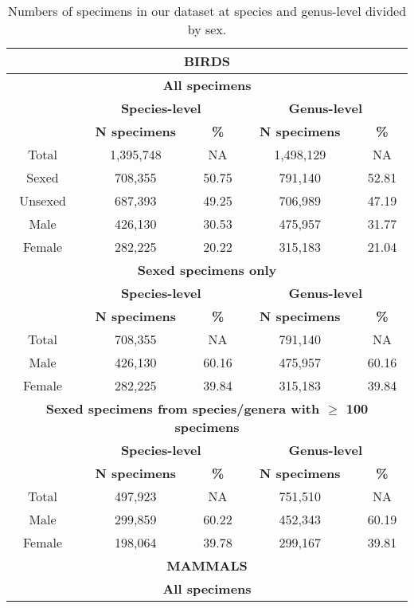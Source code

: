 
\begin{longtable}{ccccc}

\caption{Numbers of specimens in our dataset at species and genus-level divided by sex.}\\ 
  
\hline
\multicolumn{5}{c}{\textbf{BIRDS}}\\
\hline
\multicolumn{5}{c}{\textbf{All specimens}}\\
  \hline
  & \multicolumn{2}{c}{\textbf{Species-level}} & \multicolumn{2}{c}{\textbf{Genus-level}} \\
  \hline
  & \textbf{N specimens} & \textbf{\%} & \textbf{N specimens} & \textbf{\%}\\
\hline
Total & 1,395,748 & NA & 1,498,129 & NA\\
Sexed & 708,355 & 50.75 & 791,140 & 52.81\\
Unsexed & 687,393 & 49.25 & 706,989 & 47.19\\
Male & 426,130 & 30.53 & 475,957 & 31.77\\
Female & 282,225 & 20.22 & 315,183 & 21.04\\
\hline
\multicolumn{5}{c}{\textbf{Sexed specimens only}}\\
  \hline
  & \multicolumn{2}{c}{\textbf{Species-level}} & \multicolumn{2}{c}{\textbf{Genus-level}} \\
  \hline
  & \textbf{N specimens} & \textbf{\%} & \textbf{N specimens} & \textbf{\%}\\
\hline
Total & 708,355 & NA & 791,140 & NA \\
Male & 426,130 & 60.16 & 475,957 & 60.16\\
Female & 282,225 & 39.84 & 315,183 & 39.84\\
\hline
\multicolumn{5}{c}{\textbf{Sexed specimens from species/genera with $\geq$ 100 specimens}}\\
  \hline
  & \multicolumn{2}{c}{\textbf{Species-level}} & \multicolumn{2}{c}{\textbf{Genus-level}} \\
  \hline
  & \textbf{N specimens} & \textbf{\%} & \textbf{N specimens} & \textbf{\%}\\
\hline
Total & 497,923 & NA & 751,510 & NA\\
Male & 299,859 & 60.22 & 452,343 & 60.19\\
Female & 198,064 & 39.78 & 299,167 & 39.81\\
\hline
\multicolumn{5}{c}{\textbf{MAMMALS}}\\
\hline
\multicolumn{5}{c}{\textbf{All specimens}}\\

\end{longtable}
